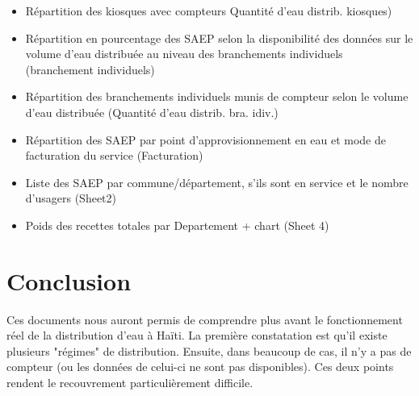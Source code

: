 \documentclass[a4paper, 11pt]{article}
\begin{document}
\begin{itemize}
    \item Répartition des kiosques avec compteurs Quantité d'eau distrib. kiosques)
    \item Répartition en pourcentage des SAEP selon la disponibilité des données sur le volume d'eau distribuée au niveau des branchements individuels (branchement individuels)
    \item Répartition des branchements individuels munis de compteur selon le volume  d'eau distribuée (Quantité d'eau distrib. bra. idiv.)
    \item Répartition des SAEP par point d'approvisionnement en eau et mode de facturation du service (Facturation)
    \item Liste des SAEP par commune/département, s'ils sont en service et le nombre d'usagers (Sheet2)
    \item Poids des recettes totales par Departement + chart (Sheet 4)
\end{itemize}

\section{Conclusion}

Ces documents nous auront permis de comprendre plus avant le fonctionnement réel de la distribution d'eau à Haïti. La première constatation est qu'il existe plusieurs "régimes" de distribution. Ensuite, dans beaucoup de cas, il n'y a pas de compteur (ou les données de celui-ci ne sont pas disponibles). Ces deux points rendent le recouvrement particulièrement difficile.
\end{document}
